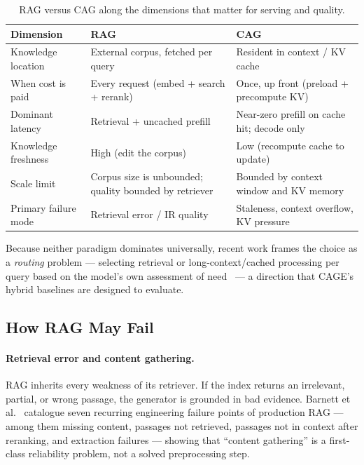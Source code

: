 \documentclass[12pt,a4paper]{article}
\let\cite\citep
\begin{document}
\begin{table}[H]
\centering
\caption{RAG versus CAG along the dimensions that matter for serving and quality.}
\label{tab:ragvscag}
\footnotesize
\begin{tabular}{@{}p{3.2cm}p{4.6cm}p{4.6cm}@{}}
\toprule
\textbf{Dimension} & \textbf{RAG} & \textbf{CAG} \\
\midrule
Knowledge location & External corpus, fetched per query & Resident in context / KV cache \\
When cost is paid & Every request (embed + search + rerank) & Once, up front (preload + precompute KV) \\
Dominant latency & Retrieval + uncached prefill & Near-zero prefill on cache hit; decode only \\
Knowledge freshness & High (edit the corpus) & Low (recompute cache to update) \\
Scale limit & Corpus size is unbounded; quality bounded by retriever & Bounded by context window and KV memory \\
Primary failure mode & Retrieval error / IR quality & Staleness, context overflow, KV pressure \\
\bottomrule
\end{tabular}
\end{table}

Because neither paradigm dominates universally, recent work frames the choice as a
\emph{routing} problem --- selecting retrieval or long-context/cached processing per
query based on the model's own assessment of need~\cite{li2024selfroute} --- a
direction that CAGE's hybrid baselines are designed to evaluate.

\subsection{How RAG May Fail}
\label{sec:ragfail}

\paragraph{Retrieval error and content gathering.} RAG inherits every weakness of
its retriever. If the index returns an irrelevant, partial, or wrong passage, the
generator is grounded in bad evidence. Barnett et al.~\cite{phillips2024seven}
catalogue seven recurring engineering failure points of production RAG --- among
them missing content, passages not retrieved, passages not in context after
reranking, and extraction failures --- showing that ``content gathering'' is a
first-class reliability problem, not a solved preprocessing step.
\end{document}
